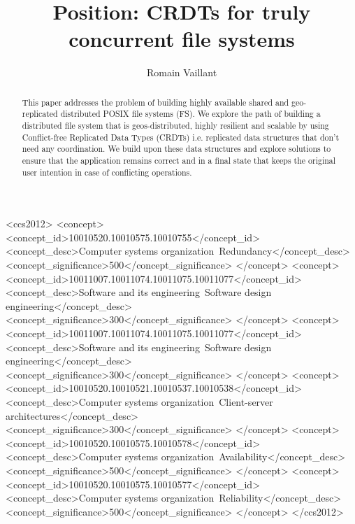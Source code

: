 \documentclass[sigconf,anonymous,10pt]{acmart}
\begin{document}
\title{Position: CRDTs for truly concurrent file systems}

\author{Romain Vaillant}


\renewcommand{\shortauthors}{R. Vaillant et al.}

\begin{abstract}
This paper addresses the problem of building highly available shared and
geo-replicated distributed POSIX file systems (FS).
We explore the path of building a distributed file system that
is geos-distributed, highly resilient and scalable by
using Conflict-free Replicated Data Types (CRDTs) i.e. replicated data
structures that don’t need any coordination. We build upon these data
structures and explore solutions to ensure that the application remains correct and in a final state that keeps the original user intention in case of conflicting operations.

\end{abstract}


%
%
\begin{CCSXML}
	<ccs2012>
	   <concept>
		   <concept_id>10010520.10010575.10010755</concept_id>
		   <concept_desc>Computer systems organization~Redundancy</concept_desc>
		   <concept_significance>500</concept_significance>
		   </concept>
	   <concept>
		   <concept_id>10011007.10011074.10011075.10011077</concept_id>
		   <concept_desc>Software and its engineering~Software design engineering</concept_desc>
		   <concept_significance>300</concept_significance>
		   </concept>
	   <concept>
		   <concept_id>10011007.10011074.10011075.10011077</concept_id>
		   <concept_desc>Software and its engineering~Software design engineering</concept_desc>
		   <concept_significance>300</concept_significance>
		   </concept>
	   <concept>
		   <concept_id>10010520.10010521.10010537.10010538</concept_id>
		   <concept_desc>Computer systems organization~Client-server architectures</concept_desc>
		   <concept_significance>300</concept_significance>
		   </concept>
	   <concept>
		   <concept_id>10010520.10010575.10010578</concept_id>
		   <concept_desc>Computer systems organization~Availability</concept_desc>
		   <concept_significance>500</concept_significance>
		   </concept>
	   <concept>
		   <concept_id>10010520.10010575.10010577</concept_id>
		   <concept_desc>Computer systems organization~Reliability</concept_desc>
		   <concept_significance>500</concept_significance>
		   </concept>
	 </ccs2012>
\end{CCSXML}
\end{document}
